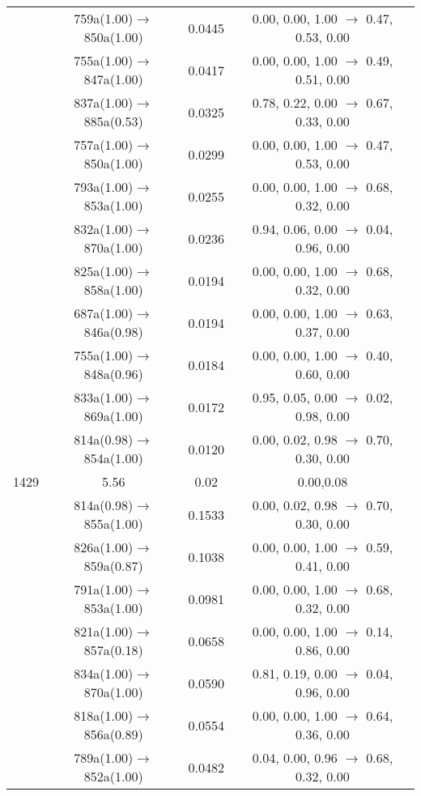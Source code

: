 \documentclass[10pt,a4paper]{article}
\begin{document}
\begin{longtable}{c|c|c|c}
 	& 759a(1.00)$\rightarrow$850a(1.00) &	 0.0445 &	 0.00, 0.00, 1.00 $\rightarrow$ 0.47, 0.53, 0.00 \\ 
 	& 755a(1.00)$\rightarrow$847a(1.00) &	 0.0417 &	 0.00, 0.00, 1.00 $\rightarrow$ 0.49, 0.51, 0.00 \\ 
 	& 837a(1.00)$\rightarrow$885a(0.53) &	 0.0325 &	 0.78, 0.22, 0.00 $\rightarrow$ 0.67, 0.33, 0.00 \\ 
 	& 757a(1.00)$\rightarrow$850a(1.00) &	 0.0299 &	 0.00, 0.00, 1.00 $\rightarrow$ 0.47, 0.53, 0.00 \\ 
 	& 793a(1.00)$\rightarrow$853a(1.00) &	 0.0255 &	 0.00, 0.00, 1.00 $\rightarrow$ 0.68, 0.32, 0.00 \\ 
 	& 832a(1.00)$\rightarrow$870a(1.00) &	 0.0236 &	 0.94, 0.06, 0.00 $\rightarrow$ 0.04, 0.96, 0.00 \\ 
 	& 825a(1.00)$\rightarrow$858a(1.00) &	 0.0194 &	 0.00, 0.00, 1.00 $\rightarrow$ 0.68, 0.32, 0.00 \\ 
 	& 687a(1.00)$\rightarrow$846a(0.98) &	 0.0194 &	 0.00, 0.00, 1.00 $\rightarrow$ 0.63, 0.37, 0.00 \\ 
 	& 755a(1.00)$\rightarrow$848a(0.96) &	 0.0184 &	 0.00, 0.00, 1.00 $\rightarrow$ 0.40, 0.60, 0.00 \\ 
 	& 833a(1.00)$\rightarrow$869a(1.00) &	 0.0172 &	 0.95, 0.05, 0.00 $\rightarrow$ 0.02, 0.98, 0.00 \\ 
 	& 814a(0.98)$\rightarrow$854a(1.00) &	 0.0120 &	 0.00, 0.02, 0.98 $\rightarrow$ 0.70, 0.30, 0.00 \\ 
 \hline1429 &	 5.56 &	 0.02 &	 0.00,0.08 \\ 
  	& 814a(0.98)$\rightarrow$855a(1.00) &	 0.1533 &	 0.00, 0.02, 0.98 $\rightarrow$ 0.70, 0.30, 0.00 \\ 
 	& 826a(1.00)$\rightarrow$859a(0.87) &	 0.1038 &	 0.00, 0.00, 1.00 $\rightarrow$ 0.59, 0.41, 0.00 \\ 
 	& 791a(1.00)$\rightarrow$853a(1.00) &	 0.0981 &	 0.00, 0.00, 1.00 $\rightarrow$ 0.68, 0.32, 0.00 \\ 
 	& 821a(1.00)$\rightarrow$857a(0.18) &	 0.0658 &	 0.00, 0.00, 1.00 $\rightarrow$ 0.14, 0.86, 0.00 \\ 
 	& 834a(1.00)$\rightarrow$870a(1.00) &	 0.0590 &	 0.81, 0.19, 0.00 $\rightarrow$ 0.04, 0.96, 0.00 \\ 
 	& 818a(1.00)$\rightarrow$856a(0.89) &	 0.0554 &	 0.00, 0.00, 1.00 $\rightarrow$ 0.64, 0.36, 0.00 \\ 
 	& 789a(1.00)$\rightarrow$852a(1.00) &	 0.0482 &	 0.04, 0.00, 0.96 $\rightarrow$ 0.68, 0.32, 0.00 \\ 

\end{longtable}
\end{document}
